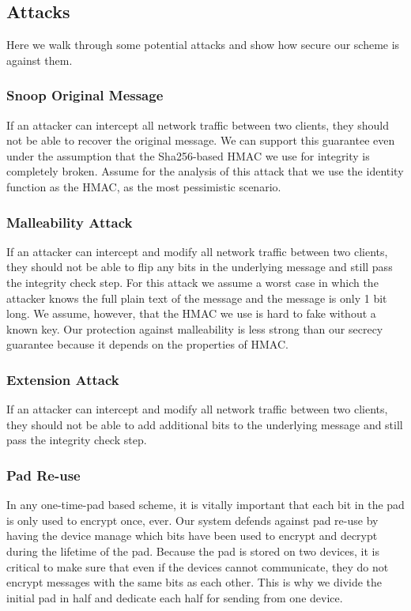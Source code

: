 \documentclass[twocolumn]{article}
\begin{document}
\subsection{Attacks}
Here we walk through some potential attacks and show how secure our scheme is against them.

\subsubsection{Snoop Original Message}
If an attacker can intercept all network traffic between two clients, they should not be able to recover the original message.
We can support this guarantee even under the assumption that the Sha256-based HMAC we use for integrity is completely broken.
Assume for the analysis of this attack that we use the identity function as the HMAC, as the most pessimistic scenario.

\subsubsection{Malleability Attack}
If an attacker can intercept and modify all network traffic between two clients, they should not be able to flip any bits in the underlying message and still pass the integrity check step.
For this attack we assume a worst case in which the attacker knows the full plain text of the message and the message is only 1 bit long.
We assume, however, that the HMAC we use is hard to fake without a known key.
Our protection against malleability is less strong than our secrecy guarantee because it depends on the properties of HMAC.

\subsubsection{Extension Attack}
If an attacker can intercept and modify all network traffic between two clients, they should not be able to add additional bits to the underlying message and still pass the integrity check step.

\subsubsection{Pad Re-use}
In any one-time-pad based scheme, it is vitally important that each bit in the pad is only used to encrypt once, ever.
Our system defends against pad re-use by having the device manage which bits have been used to encrypt and decrypt during the lifetime of the pad.
Because the pad is stored on two devices, it is critical to make sure that even if the devices cannot communicate, they do not encrypt messages with the same bits as each other. This is why we divide the initial pad in half and dedicate each half for sending from one device.
\end{document}
